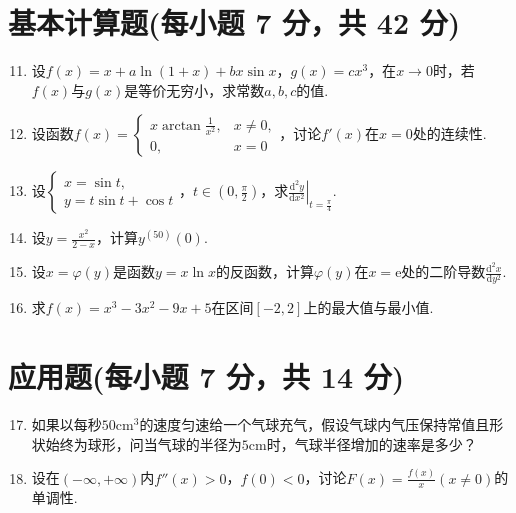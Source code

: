 \documentclass[../Main.tex]{subfiles}
\begin{document}
\section{基本计算题(每小题 7 分，共 42 分)}
\begin{enumerate}
    \setcounter{enumi}{10}
    \item 设$f(x)=x+a\ln(1+x)+bx\sin x$，$g(x)=cx^{3}$，在$x\to0$时，若$f(x)$与$g
              (x)$是等价无穷小，求常数$a,b,c$的值.
          \vspace{10em}

    \item 设函数$f(x)=
              \begin{cases}
                  x\arctan\frac{1}{x^{2}}, & x\neq0, \\
                  0,                       & x=0
              \end{cases}$，讨论$f'(x)$在$x=0$处的连续性.
          \vspace{10em}

    \item 设$\begin{cases}
                  x=\sin t, \\
                  y=t\sin t+\cos t
              \end{cases}$，$t\in\left(0,\frac{\pi}{2}\right)$，求$\left.\frac{\mathrm{d}^{2}
                  y}{\mathrm{d}x^{2}}\right|_{t=\frac{\pi}{4}}$.
          \vspace{10em}

    \item 设$y=\frac{x^{2}}{2-x}$，计算$y^{(50)}(0)$.
          \vspace{10em}

    \item 设$x=\varphi(y)$是函数$y=x\ln x$的反函数，计算$\varphi(y)$在$x=\mathrm{e}$处的二阶导数$\frac{\mathrm{d}^{2}
                  x}{\mathrm{d}y^{2}}$.
          \vspace{12em}

    \item 求$f(x)=x^{3}-3x^{2}-9x+5$在区间$[-2,2]$上的最大值与最小值.
          \vspace{12em}
\end{enumerate}

\section{应用题(每小题 7 分，共 14 分)}
\begin{enumerate}
    \setcounter{enumi}{16}
    \item 如果以每秒$50\mathrm{cm}^{3}$的速度匀速给一个气球充气，假设气球内气压保持常值且形状始终为球形，问当气球的半径为$5
              \mathrm{cm}$时，气球半径增加的速率是多少？
          \vspace{15em}

    \item 设在$\left(-\infty,+\infty\right)$内$f''(x)>0$，$f(0)<0$，讨论$F(x
              )=\frac{f(x)}{x}(x\neq0)$的单调性.
          \vspace{15em}
\end{enumerate}
\end{document}
